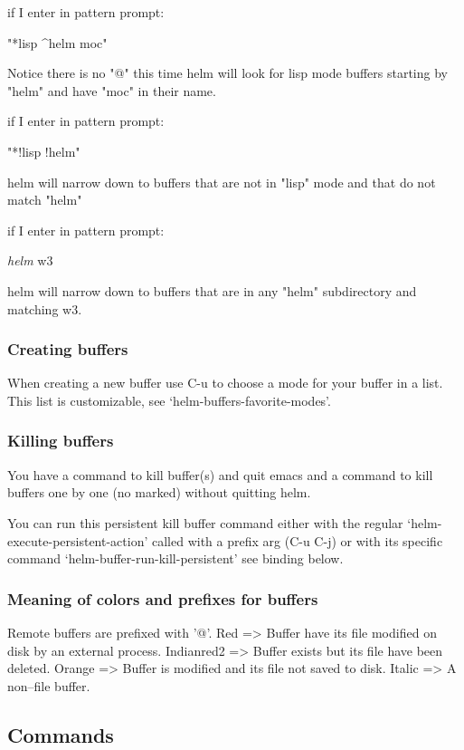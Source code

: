 \documentclass[11pt]{article}
\begin{document}
\begin{enumerate}
if I enter in pattern prompt:

"*lisp \^{}helm moc"

Notice there is no "@" this time
helm will look for lisp mode buffers starting by "helm" and have "moc" in their name.

if I enter in pattern prompt:

"*!lisp !helm"

helm will narrow down to buffers that are not in "lisp" mode and that do not match "helm"

if I enter in pattern prompt:

\emph{helm} w3

helm will narrow down to buffers that are in any "helm" subdirectory and matching w3.
\end{enumerate}

\subsubsection{Creating buffers}
\label{sec:org464e5c3}

When creating a new buffer use C-u to choose a mode for your buffer in a list.
This list is customizable, see ‘helm-buffers-favorite-modes’.

\subsubsection{Killing buffers}
\label{sec:org13849b1}

You have a command to kill buffer(s) and quit emacs and a command to kill buffers one by one
(no marked) without quitting helm.

You can run this persistent kill buffer command either with the regular
‘helm-execute-persistent-action’ called with a prefix arg (C-u C-j) or with its specific command
‘helm-buffer-run-kill-persistent’ see binding below.

\subsubsection{Meaning of colors and prefixes for buffers}
\label{sec:org1358681}

Remote buffers are prefixed with ’@’.
Red        => Buffer have its file modified on disk by an external process.
Indianred2 => Buffer exists but its file have been deleted.
Orange     => Buffer is modified and its file not saved to disk.
Italic     => A non--file buffer.

\subsection{Commands}
\label{sec:orgab7020d}
\end{document}
